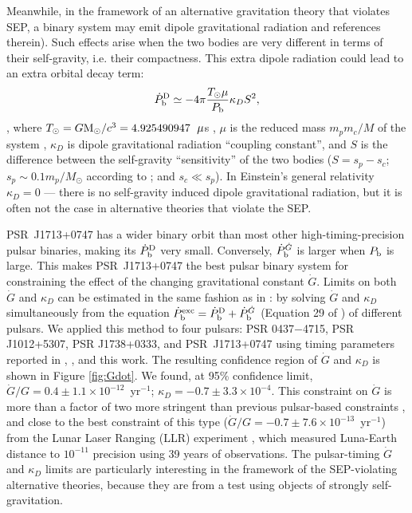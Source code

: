 Meanwhile, in the framework of an alternative gravitation theory that violates
SEP, a binary system may emit dipole gravitational radiation \citealt{Will93, Will01, lwj+09, fwe+12} and references
therein). Such effects arise when the two bodies are very different in terms
of their self-gravity, i.e.  their compactness.
This extra dipole radiation could lead to an extra orbital decay term:
\begin{equation}
\dot{P}_{\rm b}^{\rm D} \simeq -4\pi\frac{T_{\odot}\mu}{P_{\rm b}}\kappa_D S^2,
\end{equation}
\citep{lwj+09}, where $T_{\odot}=G{\rm M_{\odot}}/c^3=4.925490947$~${\rm
\mu}$s \citep{lk05}, $\mu$ is the reduced mass $m_pm_c/M$ of the system , $\kappa_D $ is dipole
gravitational radiation ``coupling constant'', and $S$ is the difference
between the self-gravity ``sensitivity'' of the two bodies ($S = s_p - s_c$;
$s_p\sim0.1m_p/M_{\odot}$ according to \citealt{de92} ; and $s_c\ll s_p$).
In Einstein's general relativity $\kappa_D=0$ --- there is no self-gravity induced
dipole gravitational radiation, but it is often not the case in alternative
theories that violate the SEP.

PSR~J1713+0747 has a wider binary orbit than most other
high-timing-precision pulsar binaries, making its $\dot{P}_{\rm b}^{\rm D}$
very small. Conversely, $\dot{P}_{\rm b}^{\dot{G}}$ is larger when $P_{\rm b}$
is large. This makes PSR~J1713+0747 the best pulsar binary system for constraining
the effect of the changing gravitational constant $\dot{G}$. Limits 
on both $\dot{G}$ and $\kappa_D$ can be estimated in the same fashion as in
\citet{lwj+09}: by solving $\dot{G}$ and $\kappa_D$ simultaneously 
from the equation $\dot{P}_{\rm b}^{\rm exc} = \dot{P}_{\rm b}^{\rm D} +
\dot{P}_{\rm b}^{\dot{G}}$ (Equation 29 of \citealt{lwj+09}) of different
pulsars. We applied this method to four pulsars: PSR 0437$-$4715, PSR J1012+5307, PSR
J1738+0333, and PSR~J1713+0747 using timing parameters reported in
\citet{lwj+09}, \citet{fwe+12}, and this work.
The resulting confidence region of $\dot{G}$ and $\kappa_D$ is shown in Figure
\ref{fig:Gdot}.
We found, at 95\% confidence limit, $\dot{G}/G =
0.4\pm1.1\times10^{-12}$~yr$^{-1}$; $\kappa_D=-0.7\pm3.3\times10^{-4}$. 
This constraint on $\dot{G}$ is more than a factor of two more stringent than
previous pulsar-based constraints \citep{fwe+12}, and close to 
the best constraint of this type
($\dot{G}/G=-0.7\pm7.6\times10^{-13}$~yr$^{-1}$) from the Lunar Laser Ranging
(LLR)
experiment \citep{hmb10}, which measured Luna-Earth distance to $10^{-11}$
precision using 39 years of observations.
The pulsar-timing $\dot{G}$ and $\kappa_D$ limits are particularly interesting 
in the framework of the SEP-violating alternative theories, because they are from 
a test using objects of strongly self-gravitation.

